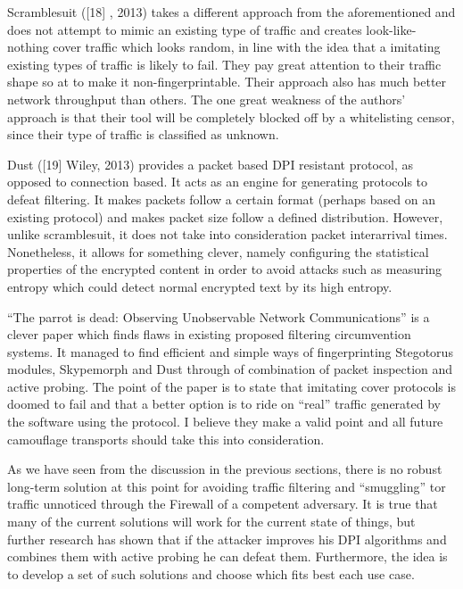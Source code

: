 \documentclass[11pt]{book} %
\begin{document}
Scramblesuit ([18] , 2013) takes a different approach from the aforementioned and does not attempt to mimic an existing type of traffic and creates look-like-nothing cover traffic which looks random, in line with the idea that a imitating existing types of traffic is likely to fail. They pay great attention to their traffic shape so at to make it non-fingerprintable. Their approach also has much better network throughput than others. The one great weakness of the authors’ approach is that their tool will be completely blocked off by a whitelisting censor, since their type of  traffic is classified as unknown.

Dust ([19] Wiley, 2013) provides a packet based DPI resistant protocol, as opposed to connection based. It acts as an engine for generating protocols to defeat filtering. It makes packets follow a certain format (perhaps based on an existing protocol) and makes packet size follow a defined distribution. However, unlike scramblesuit, it does not take into consideration packet interarrival times. Nonetheless, it allows for something clever, namely configuring the statistical properties of the encrypted content in order to avoid attacks such as measuring entropy which could detect normal encrypted text by its high entropy.

“The parrot is dead: Observing Unobservable Network Communications” is a clever paper which finds flaws in existing proposed filtering circumvention systems. It managed to find efficient and simple ways of fingerprinting Stegotorus modules, Skypemorph and Dust through of combination of packet inspection and active probing. The point of the paper is to state that imitating cover protocols is doomed to fail and that a better option is to ride on “real” traffic generated by the software using the protocol. I believe they make a valid point and all future camouflage transports should take this into consideration.


As we have seen from the discussion in the previous sections, there is no robust long-term solution at this point for avoiding traffic filtering and “smuggling” tor traffic unnoticed through the Firewall of a competent adversary. It is true that many of the current solutions will work for the current state of things, but further research has shown that if the attacker improves his DPI algorithms and combines them with active probing he can defeat them. Furthermore, the idea is to develop a set of such solutions and choose which fits best each use case.
\end{document}
